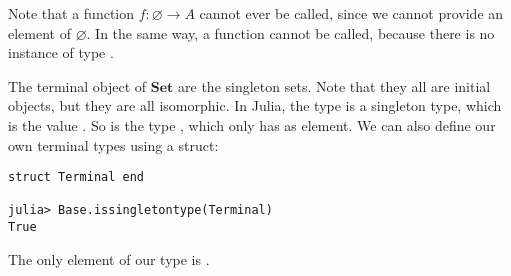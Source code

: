 Note that a function $f:\varnothing \to A$ cannot ever be called, since we cannot
provide an element of $\varnothing$. In the same way, a function
 cannot be called, because there is no instance of type .

The terminal object of $\mathbf{Set}$ are the singleton sets. Note that they all are initial objects,
but they are all isomorphic.
In Julia, the  type is a singleton type, which is the value .
So is the type , which only has \pc{()} as element.
We can also define our own terminal types using a struct:

\bigskip
\begin{lstlisting}[language=JuliaLocal, style=julia, texcl=true]
struct Terminal end

julia> Base.issingletontype(Terminal)
True
\end{lstlisting}
The only element of our type  is .
